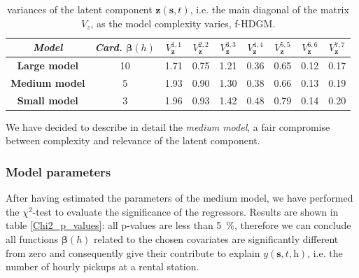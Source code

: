  \begin{table}
 	\centering
 	\renewcommand\arraystretch{1.3}
 	\begin{tabular}{c|c|c|c|c|c|c|c|c}
 		\hline
 		\textit{Model} & \textit{Card.} $\boldsymbol{\beta}(h)$ & $V_{\boldsymbol{z}}^{1,1}$ & $V_{\boldsymbol{z}}^{2,2}$ & $V_{\boldsymbol{z}}^{3,3}$ & $V_{\boldsymbol{z}}^{4,4}$ & $V_{\boldsymbol{z}}^{5,5}$ & $V_{\boldsymbol{z}}^{6,6}$ & $V_{\boldsymbol{z}}^{7,7}$ \\
 		\hline
 		\textbf{Large model} & \num{10} & \num{1.71} & \num{0.75} & \num{1.21} & \num{0.36} & \num{0.65} & \num{0.12} & \num{0.17} \\
 		\hline
 		\textbf{Medium model} & \num{5} & \num{1.93} & \num{0.90} & \num{1.30} & \num{0.38} & \num{0.66} & \num{0.13} & \num{0.19} \\
 		\hline
 		\textbf{Small model} & \num{3} & \num{1.96} & \num{0.93} & \num{1.42} & \num{0.48} & \num{0.79} & \num{0.14} & \num{0.20} \\
 		\hline
 	\end{tabular}
 	\caption[Variances of the latent component $\boldsymbol{z}(\boldsymbol{s}, t)$ as the model complexity varies (f-HDGM)]{variances of the latent component $\boldsymbol{z}(\boldsymbol{s}, t)$, i.e. the main diagonal of the matrix $V_z$, as the model complexity varies, f-HDGM.}
 	\label{V_z_values}
 \end{table}
\noindent
We have decided to describe in detail the \textit{medium model}, a fair compromise between complexity and relevance of the latent component.

\subsubsection{Model parameters}
After having estimated the parameters of the medium model, we have performed the $\chi^2$-test to evaluate the significance of the regressors. Results are shown in table \ref{Chi2_p_values}: all p-values are less than \SI{5}{\percent}, therefore we can conclude all functions $\boldsymbol{\beta}(h)$ related to the chosen covariates are significantly different from zero and consequently give their contribute to explain $\mathit{y}(\boldsymbol{s}, \textit{t}, \textit{h})$, i.e. the number of hourly pickups at a rental station.

